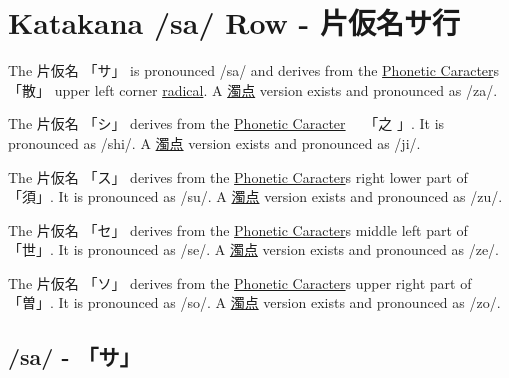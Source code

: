\section{Katakana /sa/ Row - 片仮名サ行}\label{sec:KatakanaSaRow}


\label{letter:sa} The  片仮名 {「サ」} is pronounced  /sa/ and
derives from the \hyperref[sec:PhoneticCharacter]{Phonetic Caracter}s {「散」}
upper left corner \hyperref[sec:Radical]{radical}.  A
\hyperref[sec:Dakuten]{濁点} version exists and pronounced as /za/.

\label{letter:shi} The 片仮名 {「シ」} derives from the
\hyperref[sec:PhoneticCharacter]{Phonetic Caracter}　 {「之 」}.  It is
pronounced as /shi/.  A \hyperref[sec:Dakuten]{濁点} version exists and
pronounced as /ji/.


\label{letter:su} The 片仮名 {「ス」} derives from the
\hyperref[sec:PhoneticCharacter]{Phonetic Caracter}s right lower part of
{「須」}.  It is pronounced as /su/.  A \hyperref[sec:Dakuten]{濁点} version
exists and pronounced as /zu/. 

\label{letter:se} The 片仮名 {「セ」} derives from the
\hyperref[sec:PhoneticCharacter]{Phonetic Caracter}s middle left part of
{「世」}.  It is pronounced as /se/.  A \hyperref[sec:Dakuten]{濁点} version
exists and pronounced as /ze/.  

\newpage

\label{letter:so} The 片仮名 {「ソ」} derives from the
\hyperref[sec:PhoneticCharacter]{Phonetic Caracter}s upper right part of
{「曽」}.  It is pronounced as /so/.  A \hyperref[sec:Dakuten]{濁点} version
exists and pronounced as /zo/.



\newpage
\subsection{/sa/ - 「サ」}\label{sec:KatakanaSa}


